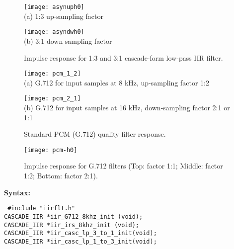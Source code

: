 \begin{figure}[tp]
  \begin{center}
\texttt{[image: asynuph0]}
    \\
   (a) 1:3 up-sampling factor

\texttt{[image: asyndwh0]}
    \\
   (b) 3:1 down-sampling factor
  \end{center}
  \caption{ Impulse response for 1:3 and 3:1 cascade-form low-pass IIR filter.
            \label{ir-casc-lp-3-1}}
\end{figure}


\begin{figure}[hbtp]
  \begin{center}
\texttt{[image: pcm\_1\_2]}
    \\
   (a) G.712 for input samples at 8 kHz, up-sampling factor 1:2

\texttt{[image: pcm\_2\_1]}
    \\
   (b) G.712 for input samples at 16 kHz, down-sampling factor 2:1 or 1:1

  \end{center}
  \caption{\SF Standard PCM (G.712) quality filter response.\label{pcm-frq}}
\end{figure}


\begin{figure}[tp]
  \begin{center}
\texttt{[image: pcm-h0]}
  \end{center}
  \caption{ \SF Impulse response for G.712 filters (Top: factor 1:1;
                Middle: factor 1:2; Bottom: factor 2:1).
                \label{pcm-ir}}
\end{figure}



{\bf Syntax: }

{\tt
\#include "iirflt.h"\\
CASCADE\_IIR *iir\_G712\_8khz\_init (void);\\
CASCADE\_IIR *iir\_irs\_8khz\_init (void);\\
CASCADE\_IIR *iir\_casc\_lp\_3\_to\_1\_init(void);\\
CASCADE\_IIR *iir\_casc\_lp\_1\_to\_3\_init(void);\\
}

